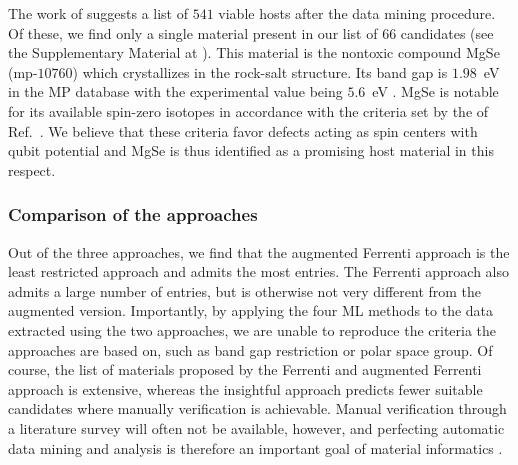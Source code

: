 \documentclass[superscriptaddress,unsortedaddress,
 amsmath,amssymb,
 aps,
]{revtex4-2}
\newcommand{\oliver}[1]{\textcolor{violet}{#1}}
\begin{document}
The work of \citeauthor{Ferrenti2020} \cite{Ferrenti2020} suggests a list of $541$ viable hosts after the data mining procedure.  
Of these, we find only a single material present in our list of $66$ candidates (see the Supplementary Material at \cite{supplementary}). This material is the nontoxic compound MgSe (mp-$10760$) which crystallizes in the rock-salt structure. Its band gap is $1.98$~eV in the MP database with the experimental value being $5.6$~eV  \cite{SaumGeorge1959}. MgSe is notable for its available spin-zero isotopes in accordance with the criteria set by the of Ref.~\cite{Ferrenti2020}. We believe that these criteria favor defects acting as spin centers with qubit potential and MgSe is thus identified as a promising host material in this respect.  


\subsubsection*{Comparison of the approaches}

Out of the three approaches, we find that the augmented Ferrenti approach is the least restricted approach and admits the most entries. The Ferrenti approach also admits a large number of entries, but is otherwise not very different from the augmented version. 
Importantly, by applying the four ML methods to the data extracted using the two approaches, we are unable to reproduce the criteria the approaches are based on, such as band gap restriction or polar space group. Of course, the list of materials proposed by the Ferrenti and augmented Ferrenti approach is extensive, whereas the insightful approach predicts fewer suitable candidates where manually verification is achievable.  
Manual verification through a literature survey will often not be available, however, and perfecting automatic data mining and analysis is therefore an important goal of material informatics \cite{rickman2019}. 
\end{document}
